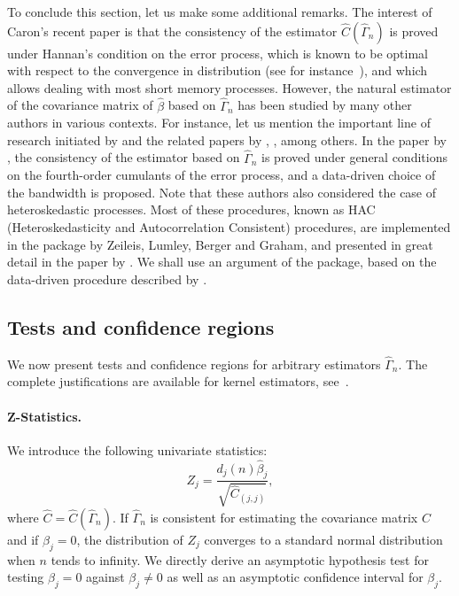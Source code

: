 To conclude this section, let us make some additional remarks. The interest of Caron's recent paper is that the consistency of the estimator $\widehat{C} (\widehat{\Gamma}_{n})$ is proved under Hannan's condition on the error process, which is known to be optimal with respect to the convergence in distribution (see for instance~\cite{dedecker2015optimality}), and which allows dealing with most short memory processes. However, the natural estimator of the covariance matrix of $\hat{\beta}$ based on $\widehat{\Gamma}_{n}$ has been studied by many other authors in various contexts. For instance, let us mention the important line of research initiated by \cite{newey1986simple, newey1994automatic} and the related papers by \cite{andrews1991heteroskedasticity}, \cite{andrews1992improved}, among others. In the paper by \cite{andrews1991heteroskedasticity}, the consistency of the estimator based on $\widehat{\Gamma}_{n}$ is proved under general conditions on the fourth-order cumulants of the error process, and a data-driven choice of the bandwidth is proposed. Note that these authors also considered the case of heteroskedastic processes. Most of these procedures, known as HAC (Heteroskedasticity and Autocorrelation Consistent) procedures, are implemented in the package  by Zeileis, Lumley, Berger and Graham, and presented in great detail in the paper by \cite{zeileis2004econometric}. We shall use an argument of the  package, based on the data-driven procedure described by \cite{andrews1991heteroskedasticity}.

\subsection{Tests and confidence regions}
\label{sub:tests}

We now present tests and confidence regions for arbitrary estimators $\widehat{\Gamma}_{n}$. The complete justifications are available for kernel estimators, see~\cite{caron2019}.

\paragraph{Z-Statistics.}
We introduce the following univariate statistics:
\begin{equation}
Z_{j} = \frac{d_{j}(n) \hat{\beta}_{j}}{\sqrt{\widehat C_{(j,j)}}},
\label{pseudoStudent}
\end{equation}
where $\widehat C = \widehat C (\widehat{\Gamma}_{n})$. If $\widehat{\Gamma}_{n}$ is consistent for estimating the covariance matrix $C$ and if $\beta_j = 0$, the distribution of $Z_{j}$ converges to a standard normal distribution when $n$ tends to infinity. We directly derive an asymptotic hypothesis test for testing $\beta_j = 0$ against $\beta_j \neq 0$ as well as an asymptotic confidence interval for $\beta_j$.

